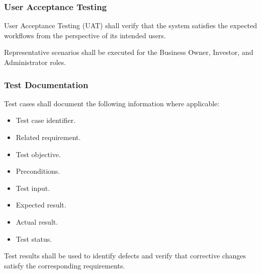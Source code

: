 \subsubsection{User Acceptance Testing}

User Acceptance Testing (UAT) shall verify that the system satisfies
the expected workflows from the perspective of its intended users.

Representative scenarios shall be executed for the Business Owner,
Investor, and Administrator roles.

\subsubsection{Test Documentation}

Test cases shall document the following information where applicable:

\begin{itemize}
    \item Test case identifier.
    \item Related requirement.
    \item Test objective.
    \item Preconditions.
    \item Test input.
    \item Expected result.
    \item Actual result.
    \item Test status.
\end{itemize}

Test results shall be used to identify defects and verify that corrective
changes satisfy the corresponding requirements.